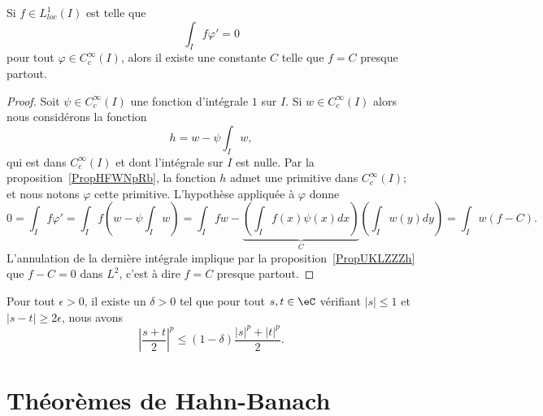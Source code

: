 \begin{proposition} \label{PropLGoLtcS}
    Si \( f\in L^1_{loc}(I)\) est telle que
    \begin{equation}
        \int_If\varphi'=0
    \end{equation}
    pour tout \( \varphi\in  C^{\infty}_c(I)\), alors il existe une constante \( C\) telle que \( f=C\) presque partout.
\end{proposition}

\begin{proof}
    Soit \( \psi\in C^{\infty}_c(I)\) une fonction d'intégrale \( 1\) sur \( I\). Si \( w\in C^{\infty}_c(I)\) alors nous considérons la fonction
    \begin{equation}
        h=w-\psi\int_Iw,
    \end{equation}
    qui est dans \(  C^{\infty}_c(I)\) et dont l'intégrale sur \( I\) est nulle. Par la proposition~\ref{PropHFWNpRb}, la fonction \( h\) admet une primitive dans \(  C^{\infty}_c(I)\); et nous notons \( \varphi\) cette primitive. L'hypothèse appliquée à \( \varphi\) donne
    \begin{equation}
        0=\int_If\varphi'=\int_If\left( w-\psi\int_Iw \right)=\int_Ifw-\underbrace{\left( \int_If(x)\psi(x)dx \right)}_C\left( \int_Iw(y)dy \right)=\int_Iw(f-C).
    \end{equation}
    L'annulation de la dernière intégrale implique par la proposition~\ref{PropUKLZZZh} que \( f-C=0\) dans \( L^2\), c'est à dire \( f=C\) presque partout.
\end{proof}

\begin{lemma}        \label{LEMooLDQRooEGWDlm}
    Pour tout \( \epsilon>0\), il existe un \( \delta>0\) tel que pour tout \( s,t\in \eC\) vérifiant \( | s |\leq 1\) et \( | s-t |\geq 2\epsilon\), nous avons
    \begin{equation}
        \left| \frac{ s+t }{ 2 } \right|^p\leq (1-\delta)\frac{ | s |^p+| t |^p }{2}.
    \end{equation}
\end{lemma}

\section{Théorèmes de Hahn-Banach}

